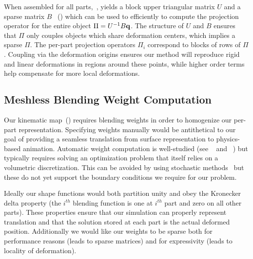 When assembled for all parts,~, yields a block upper triangular matrix $U$ and a sparse matrix $B$ ~() which can be used to efficiently to compute the projection 
operator for the entire object $\Pi = U^{-1}B\mathbf{q}$. 
The structure of $U$ and $B$ ensures that $\Pi$ only couples objects which share deformation centers, which implies a sparse $\Pi$. 
The per-part projection operators $\Pi_i$ correspond to blocks of rows of $\Pi$. 
Coupling via the deformation origins ensures our method will reproduce rigid and linear deformations in regions around these points, while higher order 
terms help compensate for more local deformations.


\subsection{Meshless Blending Weight Computation}
\label{sec:weights}

Our kinematic map~() requires blending weights in order to homogenize our per-part representation. 
Specifying weights manually would be antithetical to our goal of providing a seamless translation from surface representation to physics-based animation.
Automatic  weight computation is well-studied (see ~\citet{10.1145/2766952,BBW:2011} and ~\citet{10.1145/2010324.1964968}) but typically requires solving 
an optimization problem that itself relies on a volumetric discretization. 
This can be avoided by using stochastic methods~\cite{Sawhney:2020:MCG} but these do not yet support the boundary conditions we require for our problem. 

Ideally our shape functions would both partition unity and obey the Kronecker delta property (the $i^{th}$ blending function is one at $i^{th}$ part and zero on all other parts).
These properties ensure that our simulation can properly represent translation and that the solution stored at each part is the actual deformed position.
Additionally we would like our weights to be sparse both for performance reasons (leads to sparse matrices) and for expressivity (leads to locality of deformation). 


